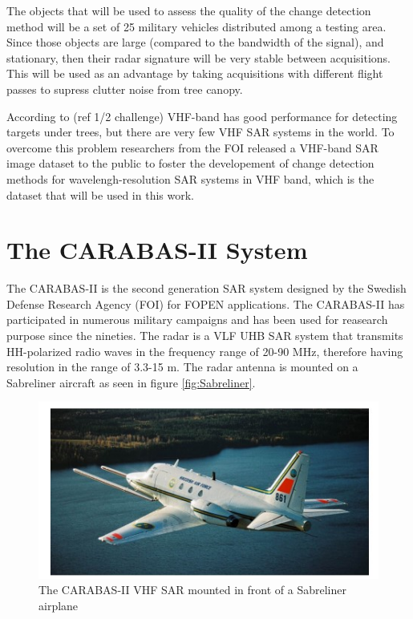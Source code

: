 The objects that will be used to assess the quality of the change detection method will be a set of 25 military vehicles distributed among a testing area.
Since those objects are large (compared to the bandwidth of the signal), and stationary, then their radar signature will be very stable between acquisitions.
This will be used as an advantage by taking acquisitions with different flight passes to supress clutter noise from tree canopy.

According to (ref 1/2 challenge) VHF-band has good performance for detecting targets under trees, but there are very few VHF SAR systems in the world.
To overcome this problem researchers from the FOI released a VHF-band SAR image dataset to the public to foster the developement of 
change detection methods for wavelengh-resolution SAR systems in VHF band, which is the dataset that will be used in this work.


\section{The CARABAS-II System}

The CARABAS-II is the second generation SAR system designed by the Swedish Defense Research Agency (FOI) for FOPEN applications.
The CARABAS-II has participated in numerous military campaigns and has been used for reasearch purpose since the nineties.
The radar is a VLF UHB SAR system that transmits HH-polarized radio waves in the frequency range of 
20-90 MHz, therefore having resolution in the range of 3.3-15 m. The radar antenna is mounted on a Sabreliner aircraft as seen in figure \ref{fig:Sabreliner}.

\begin{figure}[h]
    \centering
    \includegraphics{chapter6/sabreliner.jpg}
    \caption{The CARABAS-II VHF SAR mounted in front of a Sabreliner airplane}
    \label{fig:sabreliner}
\end{figure}

